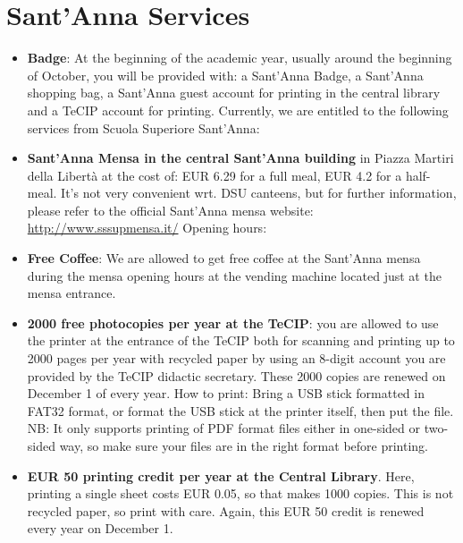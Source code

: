 \documentclass[11pt,fleqn,oneside]{book} %
\begin{document}


\chapter{Sant'Anna Services}


\begin{itemize}
\item \textbf{Badge}: At the beginning of the academic year, usually around the beginning of October, you will be provided with: a Sant’Anna Badge, a Sant’Anna shopping bag, a Sant’Anna guest account for printing in the central library and a TeCIP account for printing. Currently, we are entitled to the following services from Scuola Superiore Sant’Anna:
\item \textbf{Sant’Anna Mensa in the central Sant’Anna building} in Piazza Martiri della Libertà at the cost of: EUR 6.29 for a full meal, EUR 4.2 for a half-meal. It’s not very convenient wrt. DSU canteens, but for further information, please refer to the official Sant’Anna mensa website: \url{http://www.sssupmensa.it/}
Opening hours: 
\item \textbf{Free Coffee}: We are allowed to get free coffee at the Sant’Anna mensa during the mensa opening hours at the vending machine located just at the mensa entrance. 
\item \textbf{2000 free photocopies per year at the TeCIP}: you are allowed to use the printer at the entrance of the TeCIP both for scanning and printing up to 2000 pages per year with recycled paper by using an 8-digit account you are provided by the TeCIP didactic secretary. These 2000 copies are renewed on December 1 of every year. 
How to print: Bring a USB stick formatted in FAT32 format, or format the USB stick at the printer itself, then put the file. NB: It only supports printing of PDF format files either in one-sided or two-sided way, so make sure your files are in the right format before printing. 
\item \textbf{EUR 50 printing credit per year at the Central Library}. Here, printing a single sheet costs EUR 0.05, so that makes 1000 copies. This is not recycled paper, so print with care. Again, this EUR 50 credit is renewed every year on December 1. 

\end{itemize}
\end{document}

